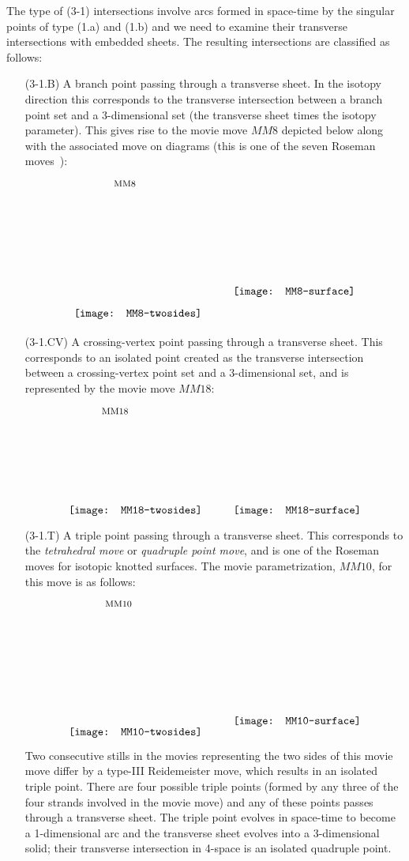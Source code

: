 \documentclass{amsart}\usepackage{amsfonts, amsmath, amssymb}\usepackage{graphicx, epic, epsf, enumerate, stmaryrd}
\theoremstyle{definition}
\numberwithin{equation}{section}
\begin{document}
The type of (3-1) intersections involve arcs formed in space-time by the singular points of type (1.a) and (1.b) and we need to examine their transverse intersections with embedded sheets. The resulting intersections are classified as follows:
\begin{enumerate}
\item[(3-1.B)] A branch point passing through a transverse sheet. In the isotopy direction this corresponds to the transverse intersection between a branch point set and a 3-dimensional set (the  transverse sheet times the isotopy parameter). This gives rise to the movie move $MM8$ depicted below along with the associated move on diagrams (this is one of the seven Roseman moves~\cite{Ros}):

\[ \put(36, 123){\fontsize{8}{8}$\text{MM8}$}
\raisebox{5pt}{\texttt{[image: MM8-twosides]}} \hspace{1cm} \raisebox{25pt}{\texttt{[image: MM8-surface]}} 
\] 

\item[(3-1.CV)] A crossing-vertex point passing through a transverse sheet. This corresponds to an isolated point created as the transverse intersection between a crossing-vertex point set and a 3-dimensional set, and is represented by the movie move $MM18$:

 \[ \put(30, 90){\fontsize{8}{8}$\text{MM18}$}
\raisebox{0pt}{\texttt{[image: MM18-twosides]}} \hspace{1cm} \raisebox{0pt}{\texttt{[image: MM18-surface]}} 
\] 

\item[(3-1.T)] A triple point passing through a transverse sheet. This corresponds to the \textit{tetrahedral move} or \textit{quadruple point move}, and is one of the Roseman moves for isotopic knotted surfaces. The movie parametrization, $MM10$, for this move is as follows:

\[ \put(33, 121){\fontsize{8}{8}$\text{MM10}$}
\raisebox{5pt}{\texttt{[image: MM10-twosides]}}  \hspace{1cm} \raisebox{15pt}{\texttt{[image: MM10-surface]}} 
\] 
Two consecutive stills in the movies representing the two sides of this movie move differ by a type-III Reidemeister move, which results in an isolated triple point. There are four possible triple points (formed by any three of the four strands involved in the movie move) and any of these points passes through a transverse sheet. The triple point evolves in space-time to become a 1-dimensional arc and the transverse sheet evolves into a 3-dimensional solid; their transverse intersection in 4-space is an isolated quadruple point. 


\end{enumerate}
\end{document}
